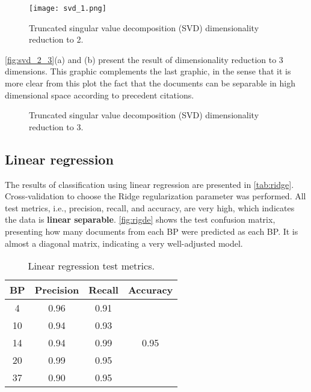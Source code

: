         \begin{figure}[H]
                \texttt{[image: svd\_1.png]}
                \caption{Truncated singular value decomposition (SVD) dimensionality reduction to 2.}
                \label{fig:svd_1}
        \end{figure}

        \autoref{fig:svd_2_3}(a) and (b) present the result of dimensionality reduction to 3 dimensions. This graphic complements the last graphic, in the sense that it is more clear from this plot the fact that the documents can be separable in high dimensional space according to precedent citations.

        \begin{figure*}[!h]
                \centering
                \qquad
                \caption{Truncated singular value decomposition (SVD) dimensionality reduction to 3.}
                \label{fig:svd_2_3}
        \end{figure*}

    \subsection{Linear regression}

        The results of classification using linear regression are presented in \autoref{tab:ridge}. Cross-validation to choose the Ridge regularization parameter was performed. All test metrics, i.e., precision, recall, and accuracy, are very high, which indicates the data is \textbf{linear separable}. \autoref{fig:rigde} shows the test confusion matrix, presenting how many documents from each BP were predicted as each BP. It is almost a diagonal matrix, indicating a very well-adjusted model.

        \begin{table}[H]
                \centering
                \caption{Linear regression test metrics.}
                \label{tab:ridge}
                \begin{tabular}{c|cc|c}
                BP & Precision & Recall & Accuracy              \\ \hline
                4  & 0.96      & 0.91   & \multirow{5}{*}{0.95} \\
                10 & 0.94      & 0.93   &                       \\
                14 & 0.94      & 0.99   &                       \\
                20 & 0.99      & 0.95   &                       \\
                37 & 0.90      & 0.95   &                      
                \end{tabular}
        \end{table}

